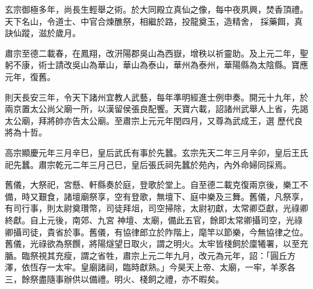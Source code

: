 \begin{pinyinscope}
 玄宗御極多年，尚長生輕舉之術。於大同殿立真仙之像，每中夜夙興，焚香頂禮。天下名山，令道士、中官合煉醮祭，相繼於路，投龍奠玉，造精舍，
 採藥餌，真訣仙蹤，滋於歲月。



 肅宗至德二載春，在鳳翔，改汧陽郡吳山為西嶽，增秩以祈靈助。及上元二年，聖躬不康，術士請改吳山為華山，華山為泰山，華州為泰州，華陽縣為太陰縣。寶應元年，復舊。



 則天長安三年，令天下諸州宜教人武藝，每年準明經進士例申奏。開元十九年，於兩京置太公尚父廟一所，以漢留侯張良配饗。天寶六載，詔諸州武舉人上省，先謁太公廟，拜將帥亦告太公廟。至肅宗上元元年閏四月，又尊為武成王，選
 歷代良將為十哲。



 高宗顯慶元年三月辛巳，皇后武氏有事於先蠶。玄宗先天二年三月辛卯，皇后王氏祀先蠶。肅宗乾元二年三月己巳，皇后張氏祠先蠶於苑內，內外命婦同採焉。



 舊儀，大祭祀，宮懸、軒縣奏於庭，登歌於堂上。自至德二載克復兩京後，樂工不備，時又艱食，諸壇廟祭享，空有登歌，無壇下、庭中樂及三舞。舊儀，凡祭享，有司行事，則太尉奠瓚幣，司徒拜俎，司空掃除，太尉初獻，太常卿亞獻，光祿卿終獻。自上元後，南郊、九宮
 神壇、太廟，備此五官，餘即太常卿攝司空，光祿卿攝司徒，貴省於事。舊儀，有協律郎立於阼階上，麾竿以節樂，今無協律之位。舊儀，光祿欲為祭饌，將陽燧望日取火，謂之明火。太牢皆棧飼於廩犧署，以至充腯。臨祭視其充瘦，謂之省牲，肅宗上元二年九月，改元為元年，詔：「圓丘方澤，依恆存一太牢。皇廟諸祠，臨時獻熟。」今昊天上帝、太廟，一牢，羊豕各三，餘祭盡隨事辦供以備禮。明火、棧飼之禮，亦不暇矣。



\end{pinyinscope}
